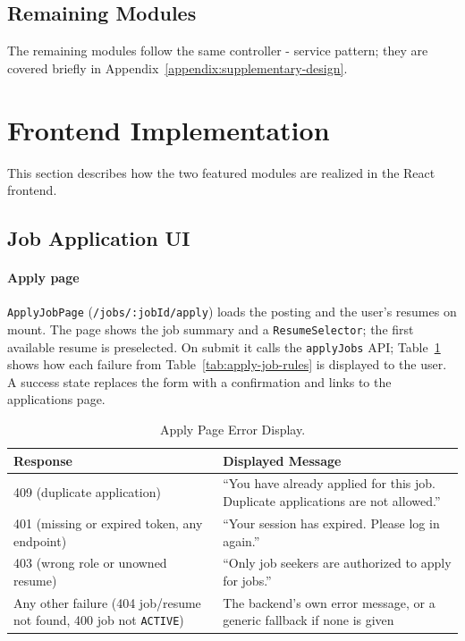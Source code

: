 \subsection{Remaining Modules}

The remaining modules follow the same controller - service pattern; they are covered briefly in Appendix~\ref{appendix:supplementary-design}.

\section{Frontend Implementation}

This section describes how the two featured modules are realized in the React frontend.


\subsection{Job Application UI}

\paragraph{Apply page}
\texttt{ApplyJobPage} (\texttt{/jobs/:jobId/apply}) loads the posting and the user's resumes on mount. The page shows the job summary and a \texttt{ResumeSelector}; the first available resume is preselected. On submit it calls the \texttt{applyJobs} API; Table~\ref{tab:apply-job-ui-errors} shows how each failure from Table~\ref{tab:apply-job-rules} is displayed to the user. A success state replaces the form with a confirmation and links to the applications page.

\begin{table}[H]
	\centering
	\caption{Apply Page Error Display.}
	\label{tab:apply-job-ui-errors}
	\begin{tabular}{|p{6.2cm}|p{7.8cm}|}
		\hline
		\textbf{Response} & \textbf{Displayed Message} \\
		\hline
		409 (duplicate application) & ``You have already applied for this job. Duplicate applications are not allowed.'' \\
		\hline
		401 (missing or expired token, any endpoint) & ``Your session has expired. Please log in again.'' \\
		\hline
		403 (wrong role or unowned resume) & ``Only job seekers are authorized to apply for jobs.'' \\
		\hline
		Any other failure (404 job/resume not found, 400 job not \texttt{ACTIVE}) & The backend's own error message, or a generic fallback if none is given \\
		\hline
	\end{tabular}
\end{table}

